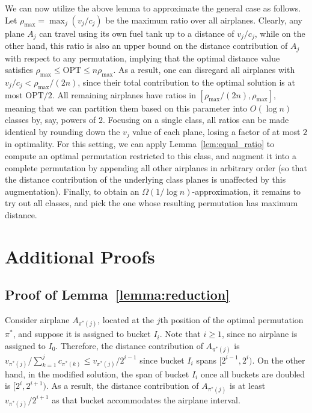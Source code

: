 \documentclass[11pt]{article}
\theoremstyle{plain}
\theoremstyle{definition}
\newcommand{\opt}{\mathrm{OPT}}
\begin{document}
We can now utilize the above lemma to approximate the general case as follows. Let $\rho_{\max} = \max_j (v_j / c_j)$ be the maximum ratio over all airplanes. Clearly, any plane $A_j$ can travel using its own fuel tank up to a distance of $v_j / c_j$, while on the other hand, this ratio is also an upper bound on the distance contribution of $A_j$ with respect to any permutation, implying that the optimal distance value satisfies $\rho_{\max} \leq \opt \leq n \rho_{\max}$. As a result, one can disregard all airplanes with $v_j / c_j < \rho_{\max} / (2n)$, since their total contribution to the optimal solution is at most $\opt/2$. All remaining airplanes have ratios in $[\rho_{\max}/(2n), \rho_{\max}]$, meaning that we can partition them based on this parameter into $O(\log n)$ classes by, say, powers of $2$. Focusing on a single class, all ratios can be made identical by rounding down the $v_j$ value of each plane, losing a factor of at most $2$ in optimality. For this setting, we can apply Lemma~\ref{lem:equal_ratio} to compute an optimal permutation restricted to this class, and augment it into a complete permutation by appending all other airplanes in arbitrary order (so that the distance contribution of the underlying class planes is unaffected by this augmentation). Finally, to obtain an $\Omega(1 / \log n)$-approximation, it remains to try out all classes, and pick the one whose resulting permutation has maximum distance.

\section{Additional Proofs} \label{app:more_proofs}

\subsection{Proof of Lemma~\ref{lemma:reduction}}

Consider airplane $A_{ \pi^*(j) }$, located at the $j$th position of the optimal permutation $\pi^*$, and suppose it is assigned to bucket $I_i$. Note that $i \geq 1$, since no airplane is assigned to $I_0$. Therefore, the distance contribution of $A_{ \pi^*(j) }$ is $v_{\pi^*(j)}/\sum_{k=1}^{j} c_{\pi^*(k)} \leq v_{\pi^*(j)}/ 2^{i-1}$ since bucket $I_i$ spans $[2^{i-1}, 2^i)$. On the other hand, in the modified solution, the span of bucket $I_i$ once all buckets are doubled is $[2^i, 2^{i+1})$. As a result, the distance contribution of $A_{ \pi^*(j) }$ is at least $v_{\pi^*(j)}/2^{i+1}$ as that bucket accommodates the airplane interval.
\end{document}

